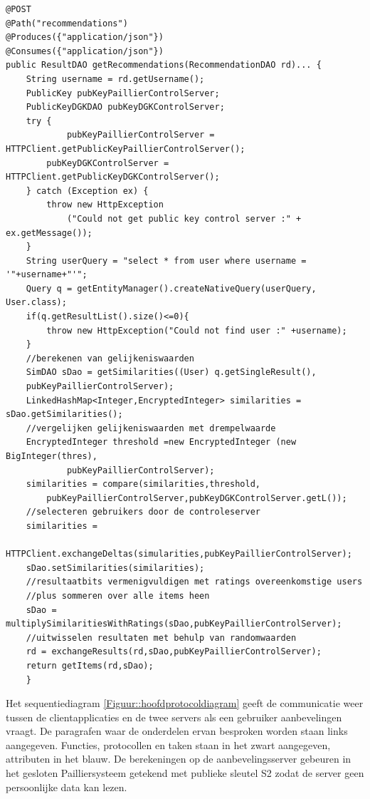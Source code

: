 \begin{verbatim}
@POST
@Path("recommendations")
@Produces({"application/json"})
@Consumes({"application/json"})
public ResultDAO getRecommendations(RecommendationDAO rd)... {    
	String username = rd.getUsername();        
    PublicKey pubKeyPaillierControlServer;
    PublicKeyDGKDAO pubKeyDGKControlServer;
    try {
    		pubKeyPaillierControlServer = HTTPClient.getPublicKeyPaillierControlServer();
        pubKeyDGKControlServer = HTTPClient.getPublicKeyDGKControlServer();
    } catch (Exception ex) {
  	    throw new HttpException
            ("Could not get public key control server :" + ex.getMessage());
    }
    String userQuery = "select * from user where username = '"+username+"'";
    Query q = getEntityManager().createNativeQuery(userQuery, User.class);
    if(q.getResultList().size()<=0){
        throw new HttpException("Could not find user :" +username);
    }
    //berekenen van gelijkeniswaarden
    SimDAO sDao = getSimilarities((User) q.getSingleResult(),
    pubKeyPaillierControlServer);
    LinkedHashMap<Integer,EncryptedInteger> similarities = sDao.getSimilarities();
    //vergelijken gelijkeniswaarden met drempelwaarde
    EncryptedInteger threshold =new EncryptedInteger (new BigInteger(thres),
    		pubKeyPaillierControlServer);
    similarities = compare(similarities,threshold,
        pubKeyPaillierControlServer,pubKeyDGKControlServer.getL());
	//selecteren gebruikers door de controleserver    
    similarities =
    		HTTPClient.exchangeDeltas(simularities,pubKeyPaillierControlServer);          
    sDao.setSimilarities(similarities);
    //resultaatbits vermenigvuldigen met ratings overeenkomstige users  
    //plus sommeren over alle items heen
    sDao = multiplySimilaritiesWithRatings(sDao,pubKeyPaillierControlServer);
    //uitwisselen resultaten met behulp van randomwaarden
    rd = exchangeResults(rd,sDao,pubKeyPaillierControlServer);
    return getItems(rd,sDao);
    }
\end{verbatim}

Het sequentiediagram \ref{Figuur::hoofdprotocoldiagram} geeft de communicatie weer tussen de clientapplicaties en de twee servers als een gebruiker aanbevelingen vraagt. De paragrafen waar de onderdelen ervan besproken worden staan links aangegeven. Functies, protocollen en taken staan in het zwart aangegeven, attributen in het blauw. De berekeningen op de aanbevelingsserver gebeuren in het gesloten Pailliersysteem getekend met publieke sleutel S2 zodat de server geen persoonlijke data kan lezen.


